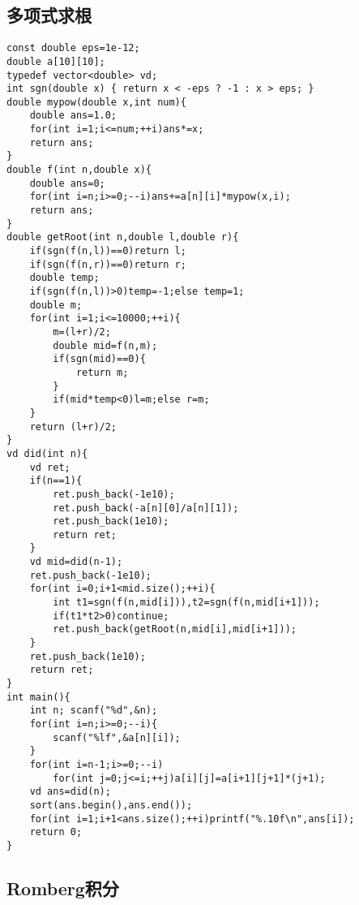 \documentclass{article}
\begin{document}
\subsection{多项式求根}

\begin{lstlisting}
const double eps=1e-12;
double a[10][10];
typedef vector<double> vd;
int sgn(double x) { return x < -eps ? -1 : x > eps; }
double mypow(double x,int num){
    double ans=1.0;
    for(int i=1;i<=num;++i)ans*=x;
    return ans;
}
double f(int n,double x){
    double ans=0;
    for(int i=n;i>=0;--i)ans+=a[n][i]*mypow(x,i);
    return ans;
}
double getRoot(int n,double l,double r){
    if(sgn(f(n,l))==0)return l;
    if(sgn(f(n,r))==0)return r;
    double temp;
    if(sgn(f(n,l))>0)temp=-1;else temp=1;
    double m;
    for(int i=1;i<=10000;++i){
        m=(l+r)/2;
        double mid=f(n,m);
        if(sgn(mid)==0){
            return m;
        }
        if(mid*temp<0)l=m;else r=m;
    }
    return (l+r)/2;
}
vd did(int n){
    vd ret;
    if(n==1){
        ret.push_back(-1e10);
        ret.push_back(-a[n][0]/a[n][1]);
        ret.push_back(1e10);
        return ret;
    }
    vd mid=did(n-1);
    ret.push_back(-1e10);
    for(int i=0;i+1<mid.size();++i){
        int t1=sgn(f(n,mid[i])),t2=sgn(f(n,mid[i+1]));
        if(t1*t2>0)continue;
        ret.push_back(getRoot(n,mid[i],mid[i+1]));
    }
    ret.push_back(1e10);
    return ret;
}
int main(){
    int n; scanf("%d",&n);
    for(int i=n;i>=0;--i){
        scanf("%lf",&a[n][i]);
    }
    for(int i=n-1;i>=0;--i)
        for(int j=0;j<=i;++j)a[i][j]=a[i+1][j+1]*(j+1);
    vd ans=did(n);
    sort(ans.begin(),ans.end());
    for(int i=1;i+1<ans.size();++i)printf("%.10f\n",ans[i]);
    return 0;
}
\end{lstlisting}

\subsection{Romberg积分}
\end{document}
